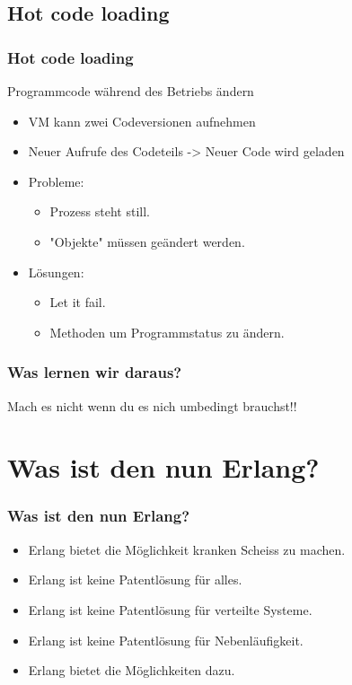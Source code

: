 \subsection{Hot code loading}
\begin{frame} %
  \frametitle{Hot code loading} %
  \begin{Definition}
    Programmcode während des Betriebs ändern
  \end{Definition}
  \begin{itemize} %
    \item VM kann zwei Codeversionen aufnehmen
    \item Neuer Aufrufe des Codeteils -> Neuer Code wird geladen
    \item Probleme:
      \begin{itemize}
        \item Prozess steht still.
        \item "Objekte" müssen geändert werden.
      \end{itemize}
    \item Lösungen:
      \begin{itemize}
        \item Let it fail.
        \item Methoden um Programmstatus zu ändern.
      \end{itemize}
  \end{itemize}
\end{frame}

\begin{frame} %
  \frametitle{Was lernen wir daraus?} %
  Mach es nicht wenn du es nich umbedingt brauchst!!
\end{frame}

\section{Was ist den nun Erlang?}
\begin{frame} %
  \frametitle{Was ist den nun Erlang?} %
  \begin{itemize} %
    \item Erlang bietet die Möglichkeit kranken Scheiss zu machen.
    \item Erlang ist keine Patentlösung für alles.
    \item Erlang ist keine Patentlösung für verteilte Systeme.
    \item Erlang ist keine Patentlösung für Nebenläufigkeit.
    \item Erlang bietet die Möglichkeiten dazu.
  \end{itemize}
\end{frame}


